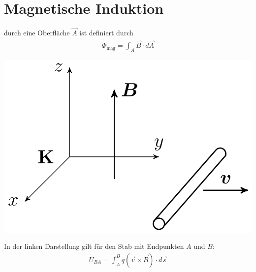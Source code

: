 \section{Magnetische Induktion}

\vspace{1\baselineskip}

 durch eine Oberfläche $\vec{A}$ ist definiert durch
\begin{align*}
    \Phi_{\text{mag}} = \int_A \vec{B} \cdot d \vec{A}
\end{align*}

\vspace{1\baselineskip}

\begin{center} 
    \begin{minipage}{0.15\textwidth}
        \begin{center}
            \includegraphics[width=\textwidth]{Figures/Induktion.png}
        \end{center}
    \end{minipage}\hspace{15pt}
    \begin{minipage}{0.3\textwidth}
        In der linken Darstellung gilt für den Stab mit Endpunkten $A$ und $B$:
        \begin{align*}
            U_{BA} = \int_A^B q (\vec{v} \times \vec{B}) \cdot d \vec{s}
        \end{align*}
    \end{minipage}
\end{center}

\vspace{1\baselineskip}

